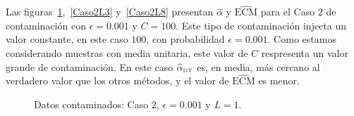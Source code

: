 Las figuras~\ref{Caso2L1},~\ref{Caso2L3} y~\ref{Caso2L8} presentan $\widehat{\alpha}$ y $\widehat{\text{ECM}}$ para el Caso $2$ de contaminación con $\epsilon=0.001$ y $C=100$. Este tipo de contaminación injecta un valor constante, en este caso $100$, con probabilidad $\epsilon=0.001$. Como estamos considerando muestras con media unitaria, este valor de $C$ respresenta un valor grande de contaminación. En este caso $\widehat\alpha_{\text{\tiny{DT}}}$ es, en media, más cercano al verdadero valor que los otros métodos, y el valor de $\widehat{\text{ECM}}$ es menor.

\begin{figure}[H]
	\caption{\label{Caso2L1}\small Datos contaminados: Caso $2$, $\epsilon=0.001$ y $L=1$.}
\end{figure}


